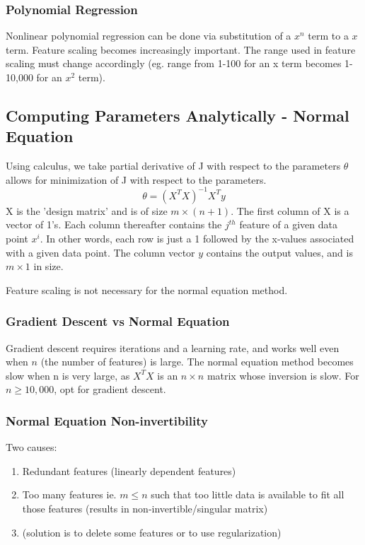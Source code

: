 \documentclass[11pt,letterpaper]{article}
\begin{document}
\subsubsection{Polynomial Regression}
Nonlinear polynomial regression can be done via substitution of a $x^n$ term to a $x$ term. Feature scaling becomes increasingly important. The range used in feature scaling must change accordingly (eg. range from 1-100 for an x term becomes 1-10,000 for an $x^2$ term).

\subsection{Computing Parameters Analytically - Normal Equation}
Using calculus, we take partial derivative of J with respect to the parameters $\theta$ allows for minimization of J with respect to the parameters.
$$\theta = (X^TX)^{-1}X^Ty$$
X is the 'design matrix' and is of size $m \times (n+1)$. The first column of X is a vector of 1's. Each column thereafter contains the $j^{th}$ feature of a given data point $x^i$. In other words, each row is just a 1 followed by the x-values associated with a given data point. The column vector $y$ contains the output values, and is $m \times 1$ in size. 

Feature scaling is not necessary for the normal equation method.

\subsubsection{Gradient Descent vs Normal Equation}
Gradient descent requires iterations and a learning rate, and works well even when $n$ (the number of features) is large. The normal equation method becomes slow when n is very large, as $X^TX$ is an $n \times n$ matrix whose inversion is slow. For $n \geq 10,000$, opt for gradient descent.

\subsubsection{Normal Equation Non-invertibility}
Two causes:
\begin{enumerate}
	\item Redundant features (linearly dependent features)
	\item Too many features ie. $ m \leq n $ such that too little data is available to fit all those features (results in non-invertible/singular matrix)
	\item (solution is to delete some features or to use regularization)
\end{enumerate}
\end{document}
